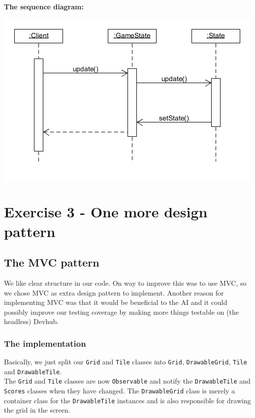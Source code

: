 \documentclass[a4paper,11pt,report]{scrartcl}
\begin{document}
\newpage\textbf{The sequence diagram:}\\
\centerline{\includegraphics[scale=1]{sources/statePatternSequence}}

\newpage\section{Exercise 3 - One more design pattern}
\subsection{The MVC pattern}
We like clear structure in our code. On way to improve this was to use MVC, so
we chose MVC as extra design pattern to implement. Another reason for
implementing MVC was that it would be beneficial to the AI and it could possibly
improve our testing coverage by making more things testable on (the headless)
Devhub.

\subsubsection{The implementation}
Basically, we just split our \texttt{Grid} and \texttt{Tile} classes into
\texttt{Grid}, \texttt{DrawableGrid}, \texttt{Tile} and \texttt{DrawableTile}.\\

The \texttt{Grid} and \texttt{Tile} classes are now \texttt{Observable} and
notify the \texttt{DrawableTile} and \texttt{Scores} classes when they have
changed. The \texttt{DrawableGrid} class is merely a container class for the
\texttt{DrawableTile} instances and is also responsible for drawing the grid in
the screen.\\
\end{document}
